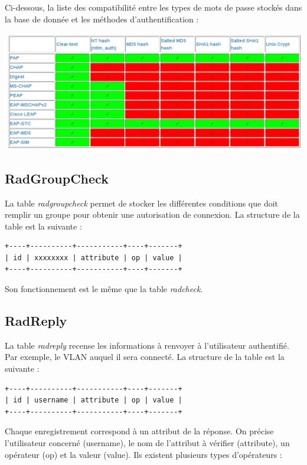 Ci-dessous, la liste des compatibilité entre les types de mots de passe stockés dans la base de donnée et les méthodes d'authentification :

\begin{center}
\includegraphics[width=400pt]{img/password_compatibility.png}
\end{center}

\subsection{RadGroupCheck}

La table \textit{radgroupcheck} permet de stocker les différentes conditions que doit remplir un groupe pour obtenir une autorisation de connexion. La structure de la table est la suivante :

\begin{verbatim}
+----+----------+-----------+----+-------+
| id | xxxxxxxx | attribute | op | value |
+----+----------+-----------+----+-------+
\end{verbatim}

Son fonctionnement est le même que la table \textit{radcheck}.

\subsection{RadReply}

La table \textit{radreply} recense les informations à renvoyer à l'utilisateur authentifié. Par exemple, le VLAN auquel il sera connecté. La structure de la table est la suivante :

\begin{verbatim}
+----+----------+-----------+----+-------+
| id | username | attribute | op | value |
+----+----------+-----------+----+-------+
\end{verbatim}

Chaque enregistrement correspond à un attribut de la réponse. On précise l'utilisateur concerné (username), le nom de l'attribut à vérifier (attribute), un opérateur (op) et la valeur (value). Ils existent plusieurs types d'opérateurs :

